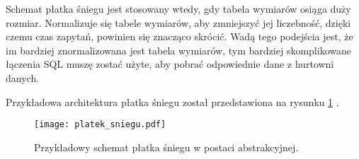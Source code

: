 Schemat płatka śniegu jest stosowany wtedy, gdy tabela wymiarów osiąga duży rozmiar.
Normalizuje się tabele wymiarów, aby zmniejszyć jej liczebność, dzięki czemu czas zapytań, 
powinien się znacząco skrócić. 
Wadą tego podejścia jest, że im bardziej znormalizowana jest tabela wymiarów,  
 tym bardziej skomplikowane łączenia SQL muszę zostać użyte, aby pobrać odpowiednie
dane z hurtowni danych. \cite{TodMan, cube}

Przykładowa architektura płatka śniegu został przedstawiona na rysunku \ref{fig:platek_sniegu} .

\begin{center}
\begin{figure}[H]
  \begin{center}
    \texttt{[image: platek\_sniegu.pdf]}
  \end{center}
  \caption{Przykładowy schemat płatka śniegu w postaci abstrakcyjnej. }
    \label{fig:platek_sniegu}
\end{figure}
\end{center}







\begin{comment}
 
\end{comment}
